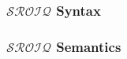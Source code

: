 \subsubsection{\texorpdfstring{$\mathcal{SROIQ}$}{SROIQ} Syntax} \label{sroiq-syntax}



\subsubsection{\texorpdfstring{$\mathcal{SROIQ}$}{SROIQ} Semantics} \label{sroiq-semantics}



